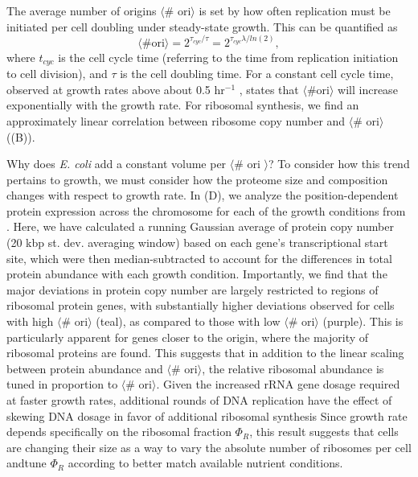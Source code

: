 The average number of origins $\langle$\# ori$\rangle$ is set by how often
replication must be initiated per cell doubling under steady-state growth.
This can be quantified as
\begin{equation}
    \langle \text{\# ori} \rangle = 2^{\tau_{cyc} / \tau} = 2^{\tau_{cyc} \lambda / ln(2)},
    \label{eq:Nori}
\end{equation}
where $t_{cyc}$ is the cell cycle time (referring to the time from replication
initiation to cell division), and $\tau$ is the cell doubling time. For a
constant cell cycle time, observed at growth rates above about 0.5 hr$^{-1}$
\citep{helmstetter1968},  states that $\langle \text{\# ori} \rangle$ will increase
exponentially with the growth rate.
For ribosomal synthesis, we find an approximately
linear correlation between ribosome copy number and $\langle$\# ori$\rangle$
((B)).

Why does \textit{E. coli} add a constant volume per $\langle$\# ori $\rangle$?
To consider how this trend pertains to growth, we must consider
how the proteome size and composition changes with respect to growth rate. In
(D), we analyze the position-dependent protein
expression across the chromosome for each of the growth conditions from
\cite{schmidt2016}. Here, we have calculated a running Gaussian average of
protein copy number (20 kbp st. dev. averaging window) based on each gene's
transcriptional start site, which were then median-subtracted to account for the
differences in total protein abundance with each growth condition. Importantly,
we find that the major deviations in protein copy number are largely restricted
to regions of ribosomal protein genes, with substantially higher deviations
observed for cells with high $\langle$\# ori$\rangle$ (teal), as compared to
those with low $\langle$\# ori$\rangle$ (purple). This is particularly apparent
for genes closer to the origin, where the majority of ribosomal proteins are
found. This suggests that in addition to the linear scaling between protein
abundance and $\langle$\# ori$\rangle$, the relative ribosomal abundance is
tuned in proportion to $\langle$\# ori$\rangle$.  Given the increased rRNA gene
dosage required at faster growth rates, additional rounds of DNA replication
have the effect of skewing DNA dosage in favor of additional ribosomal synthesis
Since growth rate depends specifically on the ribosomal fraction $\Phi_R$, this
result suggests that cells are changing their size as a way to vary the absolute
number of ribosomes per cell andtune $\Phi_R$ according to better match
available nutrient conditions.


